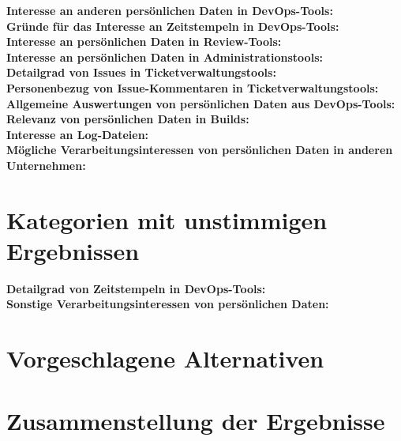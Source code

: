 \textbf{Interesse an anderen persönlichen Daten in DevOps-Tools:} \\
\textbf{Gründe für das Interesse an Zeitstempeln in DevOps-Tools:} \\
\textbf{Interesse an persönlichen Daten in Review-Tools:} \\
\textbf{Interesse an persönlichen Daten in Administrationstools:} \\
\textbf{Detailgrad von Issues in Ticketverwaltungstools:} \\
\textbf{Personenbezug von Issue-Kommentaren in Ticketverwaltungstools:} \\
\textbf{Allgemeine Auswertungen von persönlichen Daten aus DevOps-Tools:} \\
\textbf{Relevanz von persönlichen Daten in Builds:} \\
\textbf{Interesse an Log-Dateien:} \\
\textbf{Mögliche Verarbeitungsinteressen von persönlichen Daten in anderen Unternehmen:} \\

\section{Kategorien mit unstimmigen Ergebnissen} \label{noclearresult}
\textbf{Detailgrad von Zeitstempeln in DevOps-Tools:} \\
\textbf{Sonstige Verarbeitungsinteressen von persönlichen Daten:} \\

\section{Vorgeschlagene Alternativen}

\section{Zusammenstellung der Ergebnisse}




